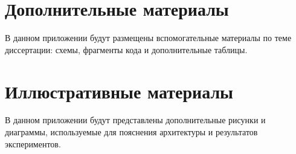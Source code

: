\chapter{Дополнительные материалы}\label{app:A}

В данном приложении будут размещены вспомогательные материалы по теме
диссертации: схемы, фрагменты кода и дополнительные таблицы.

\chapter{Иллюстративные материалы}\label{app:B}

В данном приложении будут представлены дополнительные рисунки и диаграммы,
используемые для пояснения архитектуры и результатов экспериментов.
